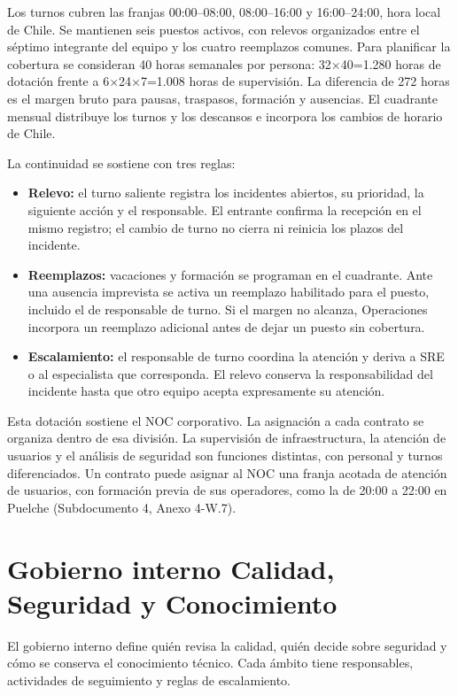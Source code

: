 Los turnos cubren las franjas 00:00–08:00, 08:00–16:00 y 16:00–24:00, hora local de Chile. Se mantienen seis puestos activos, con relevos organizados entre el séptimo integrante del equipo y los cuatro reemplazos comunes. Para planificar la cobertura se consideran 40 horas semanales por persona: 32$\times$40=1.280 horas de dotación frente a 6$\times$24$\times$7=1.008 horas de supervisión. La diferencia de 272 horas es el margen bruto para pausas, traspasos, formación y ausencias. El cuadrante mensual distribuye los turnos y los descansos e incorpora los cambios de horario de Chile.

La continuidad se sostiene con tres reglas:
\begin{itemize}
    \item \textbf{Relevo:} el turno saliente registra los incidentes abiertos, su prioridad, la siguiente acción y el responsable. El entrante confirma la recepción en el mismo registro; el cambio de turno no cierra ni reinicia los plazos del incidente.
    \item \textbf{Reemplazos:} vacaciones y formación se programan en el cuadrante. Ante una ausencia imprevista se activa un reemplazo habilitado para el puesto, incluido el de responsable de turno. Si el margen no alcanza, Operaciones incorpora un reemplazo adicional antes de dejar un puesto sin cobertura.
    \item \textbf{Escalamiento:} el responsable de turno coordina la atención y deriva a SRE o al especialista que corresponda. El relevo conserva la responsabilidad del incidente hasta que otro equipo acepta expresamente su atención.
\end{itemize}

Esta dotación sostiene el NOC corporativo. La asignación a cada contrato se organiza dentro de esa división. La supervisión de infraestructura, la atención de usuarios y el análisis de seguridad son funciones distintas, con personal y turnos diferenciados. Un contrato puede asignar al NOC una franja acotada de atención de usuarios, con formación previa de sus operadores, como la de 20:00 a 22:00 en Puelche (Subdocumento 4, Anexo 4-W.7).

\section{Gobierno interno Calidad, Seguridad y Conocimiento}

El gobierno interno define quién revisa la calidad, quién decide sobre seguridad y cómo se conserva el conocimiento técnico. Cada ámbito tiene responsables, actividades de seguimiento y reglas de escalamiento.

